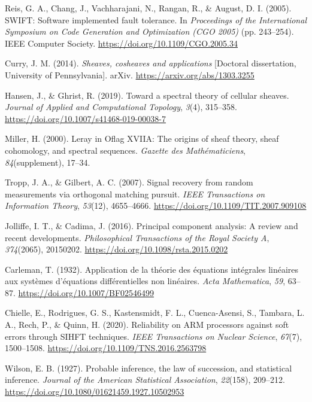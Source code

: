 \documentclass[12pt,a4paper]{article}
\theoremstyle{plain}
\theoremstyle{definition}
\begin{document}
\begin{enumerate}[label={[\arabic*]}, leftmargin=2em, itemsep=4pt]
\item Reis, G. A., Chang, J., Vachharajani, N., Rangan, R., \& August, D. I. (2005). SWIFT: Software implemented fault tolerance. In \textit{Proceedings of the International Symposium on Code Generation and Optimization (CGO 2005)} (pp. 243--254). IEEE Computer Society. \url{https://doi.org/10.1109/CGO.2005.34}

\item Curry, J. M. (2014). \textit{Sheaves, cosheaves and applications} [Doctoral dissertation, University of Pennsylvania]. arXiv. \url{https://arxiv.org/abs/1303.3255}

\item Hansen, J., \& Ghrist, R. (2019). Toward a spectral theory of cellular sheaves. \textit{Journal of Applied and Computational Topology}, \textit{3}(4), 315--358. \url{https://doi.org/10.1007/s41468-019-00038-7}

\item Miller, H. (2000). Leray in Oflag XVIIA: The origins of sheaf theory, sheaf cohomology, and spectral sequences. \textit{Gazette des Math\'ematiciens}, \textit{84}(supplement), 17--34.

\item Tropp, J. A., \& Gilbert, A. C. (2007). Signal recovery from random measurements via orthogonal matching pursuit. \textit{IEEE Transactions on Information Theory}, \textit{53}(12), 4655--4666. \url{https://doi.org/10.1109/TIT.2007.909108}

\item Jolliffe, I. T., \& Cadima, J. (2016). Principal component analysis: A review and recent developments. \textit{Philosophical Transactions of the Royal Society A}, \textit{374}(2065), 20150202. \url{https://doi.org/10.1098/rsta.2015.0202}

\item Carleman, T. (1932). Application de la th\'eorie des \'equations int\'egrales lin\'eaires aux syst\`emes d'\'equations diff\'erentielles non lin\'eaires. \textit{Acta Mathematica}, \textit{59}, 63--87. \url{https://doi.org/10.1007/BF02546499}

\item Chielle, E., Rodrigues, G. S., Kastensmidt, F. L., Cuenca-Asensi, S., Tambara, L. A., Rech, P., \& Quinn, H. (2020). Reliability on ARM processors against soft errors through SIHFT techniques. \textit{IEEE Transactions on Nuclear Science}, \textit{67}(7), 1500--1508. \url{https://doi.org/10.1109/TNS.2016.2563798}

\item Wilson, E. B. (1927). Probable inference, the law of succession, and statistical inference. \textit{Journal of the American Statistical Association}, \textit{22}(158), 209--212. \url{https://doi.org/10.1080/01621459.1927.10502953}


\end{enumerate}
\end{document}
